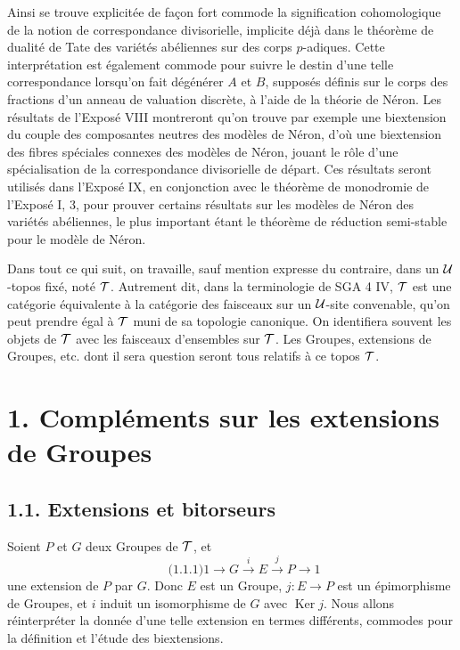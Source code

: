 \documentclass[11pt]{article}
\providecommand{\Ker}{\operatorname{Ker}}
\begin{document}
Ainsi se trouve explicitée de façon fort commode la signification cohomologique de la notion de correspondance divisorielle, implicite déjà dans le théorème de dualité de Tate des variétés abéliennes sur des corps \(p\)-adiques.  Cette interprétation est également commode pour suivre le destin d'une telle correspondance lorsqu'on fait dégénérer \(A\) et \(B\), supposés définis sur le corps des fractions d'un anneau de valuation discrète, à l'aide de la théorie de Néron.  Les résultats de l'Exposé VIII montreront qu'on trouve par exemple une biextension du couple des composantes neutres des modèles de Néron, d'où une biextension des fibres spéciales connexes des modèles de Néron, jouant le rôle d'une spécialisation de la correspondance divisorielle de départ.  Ces résultats seront utilisés dans l'Exposé IX, en conjonction avec le théorème de monodromie de l'Exposé I, 3, pour prouver certains résultats sur les modèles de Néron des variétés abéliennes, le plus important étant le théorème de réduction semi-stable pour le modèle de Néron.

Dans tout ce qui suit, on travaille, sauf mention expresse du contraire, dans un \(\mathcal U\)-topos fixé, noté \(\mathcal T\).  Autrement dit, dans la terminologie de SGA 4 IV, \(\mathcal T\) est une catégorie équivalente à la catégorie des faisceaux sur un \(\mathcal U\)-site convenable, qu'on peut prendre égal à \(\mathcal T\) muni de sa topologie canonique.  On identifiera souvent les objets de \(\mathcal T\) avec les faisceaux d'ensembles sur \(\mathcal T\).  Les Groupes, extensions de Groupes, etc. dont il sera question seront tous relatifs à ce topos \(\mathcal T\).

\section*{1. Compléments sur les extensions de Groupes}

\subsection*{1.1. Extensions et bitorseurs}

Soient \(P\) et \(G\) deux Groupes de \(\mathcal T\), et
\begin{equation}\qquad\text{(1.1.1)}
  1\longrightarrow G\xrightarrow{i}E\xrightarrow{j}P\longrightarrow 1
\end{equation}
une extension de \(P\) par \(G\).  Donc \(E\) est un Groupe, \(j:E\to P\) est un épimorphisme de Groupes, et \(i\) induit un isomorphisme de \(G\) avec \(\Ker j\).  Nous allons réinterpréter la donnée d'une telle extension en termes différents, commodes pour la définition et l'étude des biextensions.
\end{document}
